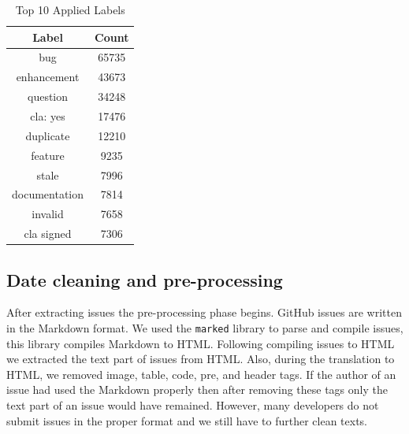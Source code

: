 \documentclass[conference]{IEEEtran}
\begin{document}
\begin{table}[t]
  \caption{Top 10 Applied Labels}
  \begin{center}
  \begin{tabular}{|c|c|}
  \hline
  \textbf{Label} & \textbf{Count}\\
  \hline
  bug           & 65735 \\
  \hline
  enhancement   & 43673 \\
  \hline
  question      & 34248 \\
  \hline
  cla: yes      & 17476 \\
  \hline
  duplicate     & 12210 \\
  \hline
  feature       & 9235 \\
  \hline
  stale         & 7996 \\
  \hline
  documentation & 7814 \\
  \hline
  invalid       & 7658 \\
  \hline
  cla signed    & 7306 \\
  \hline
  \end{tabular}
  \end{center}
  \label{tab:labels}
\end{table}

\subsection{Date cleaning and pre-processing}
After extracting issues the pre-processing phase begins. GitHub issues are written in the Markdown format.
We used the \verb|marked| \cite{web:marked} library to parse and compile issues, this library compiles
Markdown to HTML. Following compiling issues to HTML we extracted the text part of issues from HTML.
Also, during the translation to HTML, we removed image, table, code, pre, and header tags. If the
author of an issue had used the Markdown properly then after removing these tags only the text part
of an issue would have remained. However, many developers do not submit issues in the proper format and we
still have to further clean texts. 
\end{document}
